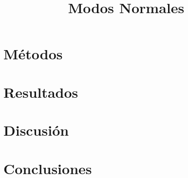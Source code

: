 \documentclass[pdflatex,sn-mathphys-num]{sn-jnl}
\begin{document}
\title[Modos Normales]{\textbf{Modos Normales}}
\author[1]{ }
\author[1]{ }
\author[1]{ }


\maketitle



\section{Métodos}%

\label{sec:Métodos}

\section{Resultados}%
\label{sec:Resultados}

\section{Discusión}%
\label{sec:Discusión}

\section{Conclusiones}%
\label{sec:Conclusiones}


\end{document}
